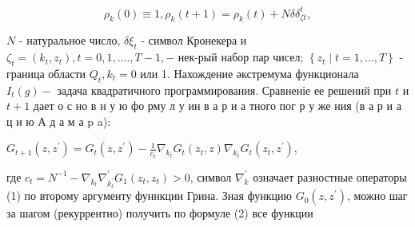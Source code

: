 \documentclass[10pt]{article}
\begin{document}
\[

\rho_{k}(0) \equiv 1, \rho_{k}(t+1)=\rho_{k}(t)+N \delta \delta_{\zeta t}^{t},

\]



$N$ - натуральное число, $\delta \xi_{t}$ - символ Кронекера и $\zeta_{t}=\left(k_{t}, z_{t}\right), t=0,1, \ldots ., T-1,-$ нек-рый набор пар чисел; $\left\{z_{t} \mid t=1, \ldots, T\right\}$ - граница области $Q_{t}, k_{t}=0$ или 1. Нахождение әкстремума функционала $I_{t}(g)-$ задача квадратичного программирования. Сравненіе ее решений при $t$ и $t+1$ дает о с но в н у ю фо рму л у ин в а р и а тного пог р у же ния (в а р и а ц и ю А д а м а p a):



$G_{t+1}\left(z, z^{\prime}\right)=G_{t}\left(z, z^{\prime}\right)-\frac{1}{c_{t}} \nabla_{k_{t}} G_{t}\left(z_{t}, z\right) \nabla_{k_{t}} G_{t}\left(z_{t}, z^{\prime}\right)$,



где $c_{t}=N^{-1}-\nabla_{k_{t}} \nabla_{k_{t}^{\prime}}^{\prime} G_{1}\left(z_{t}, z_{t}\right)>0$, символ $\nabla_{k}^{\prime}$ означает разностные операторы (1) по второму аргументу фуннкции Грина. Зная функцию $G_{0}\left(z, z^{\prime}\right)$, можно шаг за шагом (рекуррентно) получить по формуле (2) все функции
\end{document}

